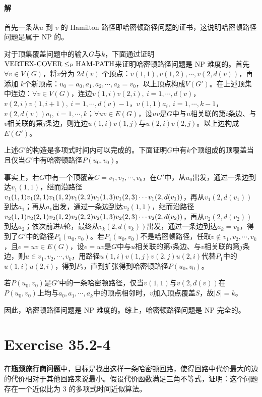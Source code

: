 \documentclass{article}
\begin{document}
\paragraph{解}
首先一条从$u$ 到 $v$ 的 Hamilton 路径即哈密顿路径问题的证书，这说明哈密顿路径问题是属于 NP 的。\par
对于顶集覆盖问题中的输入$G$与$k$，下面通过证明 $\text{VERTEX-COVER} \\ \leq_\text{P} \text{HAM-PATH}$来证明哈密顿路径问题是 NP 难度的。首先 $\forall v \in V(G)$，将$v$分为 $2d(v)$ 个顶点：$v(1,1), v(1, 2) , \cdots , v(2, d(v))$，再添加 $k$个新顶点：$u_0 = a_0, a_1, a_2, \cdots , a_k = v_0$，以上顶点构成$V(G')$。在上述顶集中连边：$\forall v \in V(G)$，连边$v(1,i)v(2,i), \ i = 1, \cdots , d(v)$，$v(2,i)v(1,i + 1), \ i = 1, \cdots , d(v) - 1$，$v(1,1)a_i, \ i = 1, \cdots , k - 1$，$v(2,d(v))a_i, \ i = 1, \cdots , k$；$\forall uv \in E(G)$，设$uv$是$G$中与$u$相关联的第$i$条边、与$v$相关联的第$j$条边，则连边$u(1,i)v(1,j)$与$u(2,i)v(2,j)$。以上边构成$E(G')$。\par
上述$G'$的构造是多项式时间内可以完成的。下面证明$G$中有$k$个顶组成的顶覆盖当且仅当$G'$中有哈密顿路径$P(u_0, v_0)$。\par
事实上，若$G$中有一个顶覆盖$C = {v_1, v_2, \cdots, v_k}$，在$G'$中，从$u_0$出发，通过一条边到达$v_1(1,1)$，继而沿路径$v_1(1,1)v_1(2,1)v_1(1,2)v_1(2,2)v_1(1,3) \\ v_1(2,3)\cdots v_1(2,d(v_1))$，再从$v_1(2,d(v_1))$到达$a_1$；再从$a_1$出发，通过一条边到达$v_2(1,1)$，继而沿路径$v_2(1,1)v_2(2,1)v_2(1,2)v_2(2,2)v_2(1,3)v_2(2,3) \cdots \\ v_2(2,d(v_2))$，再从$v_2(2,d(v_2))$到达$a_2$；依次前进$k$轮，最终从$v_k(2,d(v_k))$出发，通过一条边到达$a_k = v_0$，得到了$G'$中的路径$P_1(u_0, v_0)$。若$P_1(u_0, v_0)$不是哈密顿路径，任取$v \notin {v_1, v_2, \cdots, v_k}$，且$e = uv \in E(G)$，设$e = uv$是$G$中与$u$相关联的第$i$条边、与$v$相关联的第$j$条边，则$u \in {v_1, v_2, \cdots, v_k}$，用路径$u(1, i)v(1, j)v(2, j)u(2, i)$代替$P_1$中的$u(1,i)u(2,i)$，得到$P_2$，直到扩张得到哈密顿路径$P(u_0, v_0)$。\par
若$P(u_0, v_0)$是$G'$中的一条哈密顿路径，仅当$v(1,1)$与$v(2, d(v))$在$P(u_0, v_0)$上均与${a_0, a_1, \cdots, a_k}$中的顶点相邻时，$v$加入顶点覆盖$S$，故$|S| = k$。\par
因此，哈密顿路径问题是 NP 难度的。综上，哈密顿路径问题是 NP 完全的。

\section{Exercise 35.2-4}
在\textbf{瓶颈旅行商问题}中，目标是找出这样一条哈密顿回路，使得回路中代价最大的边的代价相对于其他回路来说最小。假设代价函数满足三角不等式，证明：这个问题存在一个近似比为 3 的多项式时间近似算法。
\end{document}
